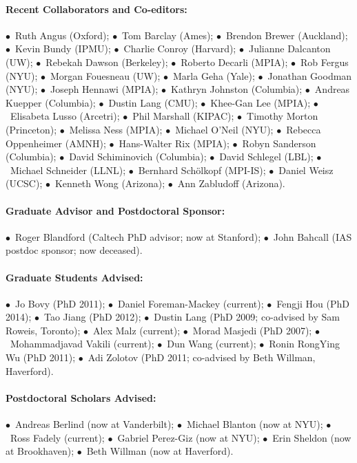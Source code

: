 \documentclass[letterpaper,12pt]{article}
\begin{document}
\paragraph{Recent Collaborators and Co-editors:}
$\bullet$~Ruth Angus (Oxford);
$\bullet$~Tom Barclay (Ames);
$\bullet$~Brendon Brewer (Auckland);
$\bullet$~Kevin Bundy (IPMU);
$\bullet$~Charlie Conroy (Harvard);
$\bullet$~Julianne Dalcanton (UW);
$\bullet$~Rebekah Dawson (Berkeley);
$\bullet$~Roberto Decarli (MPIA);
$\bullet$~Rob Fergus (NYU);
$\bullet$~Morgan Fouesneau (UW);
$\bullet$~Marla Geha (Yale);
$\bullet$~Jonathan Goodman (NYU);
$\bullet$~Joseph Hennawi (MPIA);
$\bullet$~Kathryn Johnston (Columbia);
$\bullet$~Andreas Kuepper (Columbia);
$\bullet$~Dustin Lang (CMU);
$\bullet$~Khee-Gan Lee (MPIA);
$\bullet$~Elisabeta Lusso (Arcetri);
$\bullet$~Phil Marshall (KIPAC);
$\bullet$~Timothy Morton (Princeton);
$\bullet$~Melissa Ness (MPIA);
$\bullet$~Michael O'Neil (NYU);
$\bullet$~Rebecca Oppenheimer (AMNH);
$\bullet$~Hans-Walter Rix (MPIA);
$\bullet$~Robyn Sanderson (Columbia);
$\bullet$~David Schiminovich (Columbia);
$\bullet$~David Schlegel (LBL);
$\bullet$~Michael Schneider (LLNL);
$\bullet$~Bernhard Sch\"olkopf (MPI-IS);
$\bullet$~Daniel Weisz (UCSC);
$\bullet$~Kenneth Wong (Arizona);
$\bullet$~Ann Zabludoff (Arizona).

\paragraph{Graduate Advisor and Postdoctoral Sponsor:}
$\bullet$~Roger Blandford (Caltech PhD advisor; now at Stanford);
$\bullet$~John Bahcall (IAS postdoc sponsor; now deceased).

\paragraph{Graduate Students Advised:}
$\bullet$~Jo Bovy (PhD 2011);
$\bullet$~Daniel Foreman-Mackey (current);
$\bullet$~Fengji Hou (PhD 2014);
$\bullet$~Tao Jiang (PhD 2012);
$\bullet$~Dustin Lang (PhD 2009; co-advised by Sam Roweis, Toronto);
$\bullet$~Alex Malz (current);
$\bullet$~Morad Masjedi (PhD 2007);
$\bullet$~Mohammadjavad Vakili (current);
$\bullet$~Dun Wang (current);
$\bullet$~Ronin RongYing Wu (PhD 2011);
$\bullet$~Adi Zolotov (PhD 2011; co-advised by Beth Willman, Haverford).

\paragraph{Postdoctoral Scholars Advised:}
$\bullet$~Andreas Berlind (now at Vanderbilt);
$\bullet$~Michael Blanton (now at NYU);
$\bullet$~Ross Fadely (current);
$\bullet$~Gabriel Perez-Giz (now at NYU);
$\bullet$~Erin Sheldon (now at Brookhaven);
$\bullet$~Beth Willman (now at Haverford).
\end{document}
